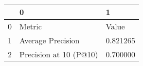 \begin{tabular}{lll}
\toprule
 & 0 & 1 \\
\midrule
0 & Metric & Value \\
1 & Average Precision & 0.821265 \\
2 & Precision at 10 (P@10) & 0.700000 \\
\bottomrule
\end{tabular}

